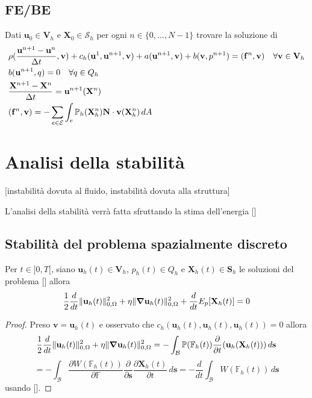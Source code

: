 \subsection{FE/BE}
\begin{problem}
Dati $\mathbf{u}_0\in\mathbf{V}_h$ e  $\mathbf{X}_0\in\mathcal{S}_h$ per ogni $n\in\{0,...,N-1\}$ trovare la soluzione di
\begin{equation}
\begin{aligned}
&\rho(\frac{\mathbf{u}^{n+1}-\mathbf{u}^{n}}{\Delta t}, \mathbf{v}) + c_h(\mathbf{u}^{1},\mathbf{u}^{n+1},\mathbf{v}) + a(\mathbf{u}^{n+1},\mathbf{v}) + b(\mathbf{v},p^{n+1}) = \ps{\mathbf{f}^{n}}{\mathbf{v}} \quad \forall\mathbf{v}\in\mathbf{V}_h\\
&b(\mathbf{u}^{n+1},q)=0 \quad \forall q\in Q_h\\
&\frac{\mathbf{X}^{n+1}-\mathbf{X}^{n}}{\Delta t} = \mathbf{u}^{n+1}(\mathbf{X}^{n})\\
&\ps{\mathbf{f}^{n}}{\mathbf{v}}=-\sum_{e\in\mathcal{E}}\int_e\mathbb{P}_h(\mathbf{X}_h^{n})\mathbf{N}\cdot\mathbf{v}(\mathbf{X}^{n}_h)\,dA\\
\end{aligned}
\end{equation}
\end{problem}

\section{Analisi della stabilità}

[instabilità dovuta al fluido, instabilità dovuta alla struttura]

L'analisi della stabilità verrà fatta sfruttando la stima dell'energia []

\subsection{Stabilità del problema spazialmente discreto}

\begin{theorem}
Per $t\in]0,T[$, siano $\mathbf{u}_h(t)\in\mathbf{V}_h$, $p_h(t)\in Q_h$ e $\mathbf{X}_h(t)\in\mathbf{S}_h$ le soluzioni del problema [] allora
$$\frac{1}{2}\frac{d}{dt}\Vert\mathbf{u}_h(t)\Vert^2_{0,\Omega}+\eta\Vert\boldsymbol{\nabla}\mathbf{u}_h(t)\Vert^2_{0,\Omega}+\frac{d}{dt}E_p[\mathbf{X}_h(t)]=0$$
\end{theorem}
\begin{proof}
Preso $\mathbf{v}=\mathbf{u}_h(t)$ e osservato che $c_h(\mathbf{u}_h(t),\mathbf{u}_h(t),\mathbf{u}_h(t))=0$ allora
$$\frac{1}{2}\frac{d}{dt}\Vert\mathbf{u}_h(t)\Vert^2_{0,\Omega}+\eta\Vert\boldsymbol{\nabla}\mathbf{u}_h(t)\Vert^2_{0,\Omega} = -\int_{\mathcal{B}}\mathbb{P}(\mathbb{F}_h(t))\frac{\partial}{\partial t}(\mathbf{u}_h(\mathbf{X}_h(t)))\,d\mathbf{s}$$
$$=-\int_{\mathcal{B}}\frac{\partial W(\mathbb{F}_h(t))}{\partial \mathbb{F}}\frac{\partial}{\partial \mathbf{s}}\frac{\partial\mathbf{X}_h(t)}{\partial t}\,d\mathbf{s}=-\frac{d}{dt}\int_{\mathcal{B}}W(\mathbb{F}_h(t))\,d\mathbf{s}$$
usando [].
\end{proof}

